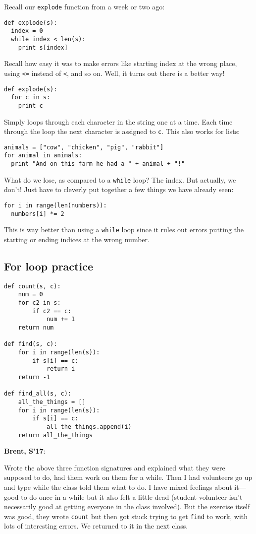 \documentclass{article}
\newenvironment{reflect}[1]
{
  \noindent
  \begin{lrbox}{\reflectbox}
    \begin{minipage}[t]{\textwidth}
      \textbf{#1}:
}{
    \end{minipage}
  \end{lrbox}
  \fbox{\usebox{\reflectbox}}
}
\begin{document}
Recall our \verb|explode| function from a week or two ago:
\begin{verbatim}
def explode(s):
  index = 0
  while index < len(s):
    print s[index]
\end{verbatim}
Recall how easy it was to make errors like starting index at the wrong
place, using \verb|<=| instead of \verb|<|, and so on.  Well, it turns
out there is a better way!
\begin{verbatim}
def explode(s):
  for c in s:
    print c
\end{verbatim}
Simply loops through each character in the string one at a time.  Each
time through the loop the next character is assigned to \verb|c|.
This also works for lists:
\begin{verbatim}
animals = ["cow", "chicken", "pig", "rabbit"]
for animal in animals:
  print "And on this farm he had a " + animal + "!"
\end{verbatim}
What do we lose, as compared to a \verb|while| loop?  The index. But
actually, we don't!  Just have to cleverly put together a few things
we have already seen:
\begin{verbatim}
for i in range(len(numbers)):
  numbers[i] *= 2
\end{verbatim}
This is way better than using a \verb|while| loop since it rules out
errors putting the starting or ending indices at the wrong number.

\subsection*{For loop practice}

\begin{verbatim}
def count(s, c):
    num = 0
    for c2 in s:
        if c2 == c:
            num += 1
    return num

def find(s, c):
    for i in range(len(s)):
        if s[i] == c:
            return i
    return -1

def find_all(s, c):
    all_the_things = []
    for i in range(len(s)):
        if s[i] == c:
            all_the_things.append(i)
    return all_the_things
\end{verbatim}

\begin{reflect}{Brent, S'17}
  Wrote the above three function signatures and explained what they
  were supposed to do, had them work on them for a while.  Then I had
  volunteers go up and type while the class told them what to do.  I
  have mixed feelings about it---good to do once in a while but it
  also felt a little dead (student volunteer isn't necessarily good at
  getting everyone in the class involved).  But the exercise itself
  was good, they wrote \verb|count| but then got stuck trying to get
  \verb|find| to work, with lots of interesting errors.  We returned
  to it in the next class.
\end{reflect}
\end{document}
